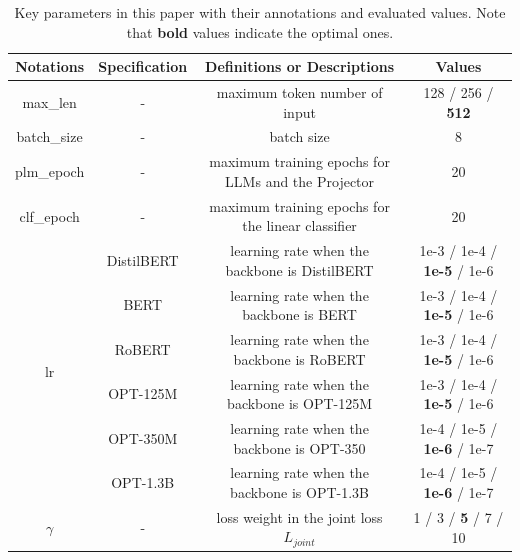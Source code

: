 \documentclass[letterpaper]{article} %
\begin{document}
 \begin{table}[htbp]
\small
\setlength\tabcolsep{5pt}
\caption{Key parameters in this paper with their annotations and evaluated values. Note that \textbf{bold} values indicate the optimal ones.}\label{tab:app_para}
\label{tab:symbols}
\centering
\begin{tabular}{@{}cccc@{}}
\toprule
\textbf{Notations}    & \textbf{Specification} & \textbf{Definitions or Descriptions}              & \textbf{Values}                  \\ \midrule
max\_len              & -                      & maximum token number of input                     & 128 / 256 / \textbf{512}                             \\
batch\_size           & -                      & batch size                                        & 8                                \\
plm\_epoch            & -                      & maximum training epochs for LLMs and the Projector     & 20                               \\
clf\_epoch            & -                      & maximum training epochs for the linear classifier & 20                               \\

\multirow{6}{*}{lr}   & DistilBERT                   & learning rate when the backbone is DistilBERT               & 1e-3 / 1e-4 / \textbf{1e-5} / 1e-6 \\
                      & BERT                   & learning rate when the backbone is BERT               & 1e-3 / 1e-4 / \textbf{1e-5} / 1e-6   \\
                      & RoBERT                   & learning rate when the backbone is RoBERT               & 1e-3 / 1e-4 / \textbf{1e-5} / 1e-6   \\
                      & OPT-125M                   & learning rate when the backbone is OPT-125M               & 1e-3 / 1e-4 / \textbf{1e-5} / 1e-6   \\
                      & OPT-350M                   & learning rate when the backbone is OPT-350               & 1e-4 / 1e-5 / \textbf{1e-6} / 1e-7   \\
                      & OPT-1.3B                & learning rate when the backbone is OPT-1.3B            & 1e-4 / 1e-5 / \textbf{1e-6} / 1e-7    \\
$\gamma$ & -                      & loss weight in the joint loss $L_{joint}$                    & 1 / 3 / \textbf{5} / 7 / 10            \\ \bottomrule
\end{tabular}
\end{table}
\end{document}
